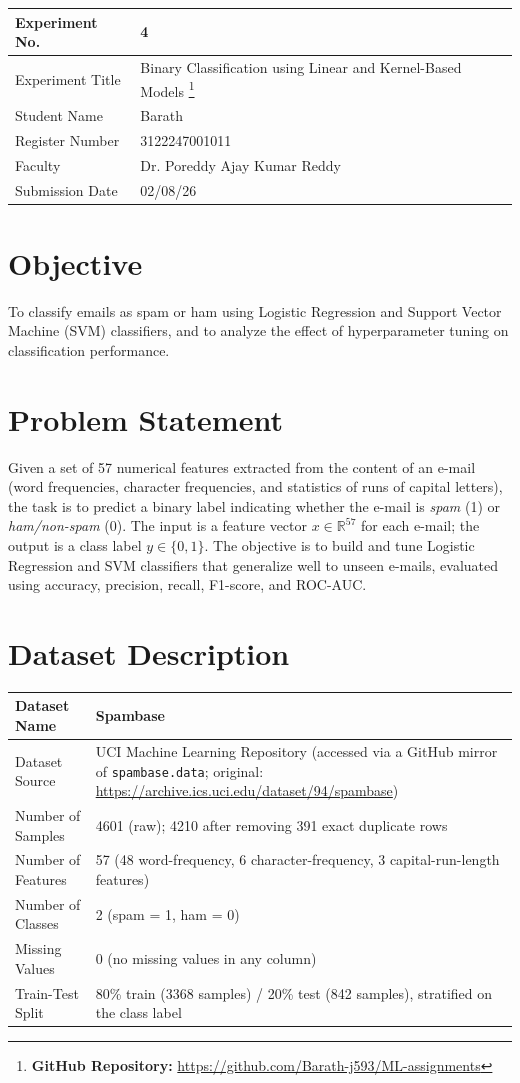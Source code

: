 \documentclass[12pt,a4paper]{article}
\begin{document}
\begin{tabular}{|p{4cm}|p{11cm}|}
\hline
Experiment No. & 4 \\ \hline
Experiment Title & Binary Classification using Linear and Kernel-Based Models
\footnote{\textbf{GitHub Repository: }\url{https://github.com/Barath-j593/ML-assignments}}\\ \hline
Student Name & Barath \\ \hline
Register Number & 3122247001011 \\ \hline
Faculty & Dr. Poreddy Ajay Kumar Reddy \\ \hline
Submission Date & 02/08/26\\ \hline
\end{tabular}

\section{Objective}
To classify emails as spam or ham using Logistic Regression and Support Vector Machine (SVM) classifiers, and to analyze the effect of hyperparameter tuning on classification performance.

\section{Problem Statement}
Given a set of 57 numerical features extracted from the content of an e-mail (word frequencies, character frequencies, and statistics of runs of capital letters), the task is to predict a binary label indicating whether the e-mail is \emph{spam} (1) or \emph{ham/non-spam} (0). The input is a feature vector $x \in \mathbb{R}^{57}$ for each e-mail; the output is a class label $y \in \{0,1\}$. The objective is to build and tune Logistic Regression and SVM classifiers that generalize well to unseen e-mails, evaluated using accuracy, precision, recall, F1-score, and ROC-AUC.

\section{Dataset Description}
\begin{longtable}{|p{6cm}|p{8cm}|}
\hline
Dataset Name & Spambase \\ \hline
Dataset Source & UCI Machine Learning Repository (accessed via a GitHub mirror of \texttt{spambase.data}; original: \url{https://archive.ics.uci.edu/dataset/94/spambase}) \\ \hline
Number of Samples & 4601 (raw); 4210 after removing 391 exact duplicate rows \\ \hline
Number of Features & 57 (48 word-frequency, 6 character-frequency, 3 capital-run-length features) \\ \hline
Number of Classes & 2 (spam = 1, ham = 0) \\ \hline
Missing Values & 0 (no missing values in any column) \\ \hline
Train-Test Split & 80\% train (3368 samples) / 20\% test (842 samples), stratified on the class label \\ \hline
\end{longtable}
\end{document}
